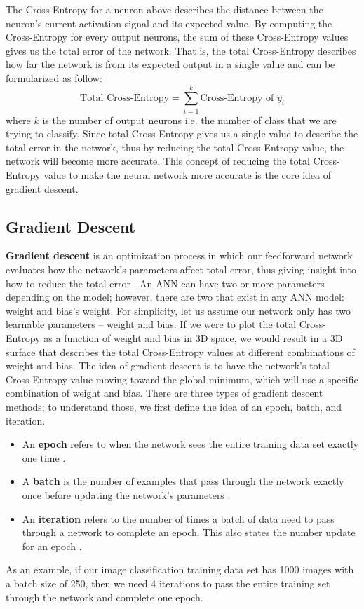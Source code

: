 The Cross-Entropy for a neuron above describes the distance between the neuron's current activation signal and its expected value. By computing the Cross-Entropy for every output neurons, the sum of these Cross-Entropy values gives us the total error of the network. That is, the total Cross-Entropy describes how far the network is from its expected output in a single value and can be formularized as follow:
\[
    \text{Total Cross-Entropy} = \sum^k_{i=1} \text{Cross-Entropy of }\hat{y}_i
\]
where $k$ is the number of output neurons i.e. the number of class that we are trying to classify. Since total Cross-Entropy gives us a single value to describe the total error in the network, thus by reducing the total Cross-Entropy value, the network will become more accurate. This concept of reducing the total Cross-Entropy value to make the neural network more accurate is the core idea of gradient descent.

\subsection{Gradient Descent}
\textbf{Gradient descent} is an optimization process in which our feedforward network evaluates how the network's parameters affect total error, thus giving insight into how to reduce the total error \cite{taylor2017neural}. An ANN can have two or more parameters depending on the model; however, there are two that exist in any ANN model: weight and bias's weight. For simplicity, let us assume our network only has two learnable parameters -- weight and bias. If we were to plot the total Cross-Entropy as a function of weight and bias in 3D space, we would result in a 3D surface that describes the total Cross-Entropy values at different combinations of weight and bias. The idea of gradient descent is to have the network's total Cross-Entropy value moving toward the global minimum, which will use a specific combination of weight and bias. There are three types of gradient descent methods; to understand those, we first define the idea of an epoch, batch, and iteration.
%
\begin{itemize}
    \item An \textbf{epoch} refers to when the network sees the entire training data set exactly one time \cite{taylor2017neural}.
    \item A \textbf{batch} is the number of examples that pass through the network exactly once before updating the network's parameters \cite{taylor2017neural}.
    \item An \textbf{iteration} refers to the number of times a batch of data need to pass through a network to complete an epoch. This also states the number update for an epoch \cite{taylor2017neural}.
\end{itemize}
%
As an example, if our image classification training data set has 1000 images with a batch size of 250, then we need 4 iterations to pass the entire training set through the network and complete one epoch.

